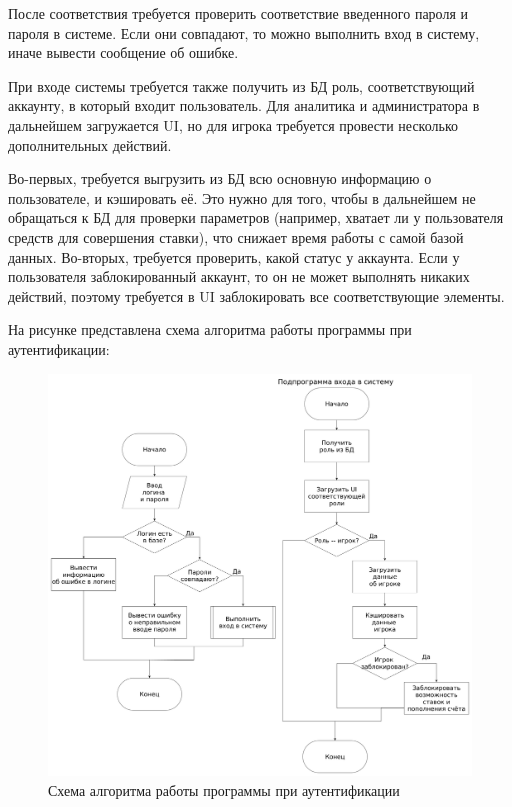 После соответствия требуется проверить соответствие введенного пароля и пароля в системе. 
Если они совпадают, то можно выполнить вход в систему, иначе вывести сообщение об ошибке.

При входе системы требуется также получить из БД роль, соответствующий аккаунту, в который входит пользователь.
Для аналитика и администратора в дальнейшем загружается UI, но для игрока требуется провести несколько дополнительных действий.

Во-первых, требуется выгрузить из БД всю основную информацию о пользователе, и кэшировать её.
Это нужно для того, чтобы в дальнейшем не обращаться к БД для проверки параметров (например, хватает ли у пользователя средств для совершения ставки), что снижает время работы с самой базой данных.
Во-вторых, требуется проверить, какой статус у аккаунта. 
Если у пользователя заблокированный аккаунт, то он не может выполнять никаких действий, поэтому требуется в UI заблокировать все соответствующие элементы.

На рисунке представлена схема алгоритма работы программы при аутентификации:
\FloatBarrier
\begin{figure}[hp]	
	\begin{center}
		\includegraphics[width=\linewidth]{inc/auth.png}
	\end{center}
	\caption{Схема алгоритма работы программы при аутентификации}
	\label{fig::auth}
\end{figure}
\FloatBarrier

